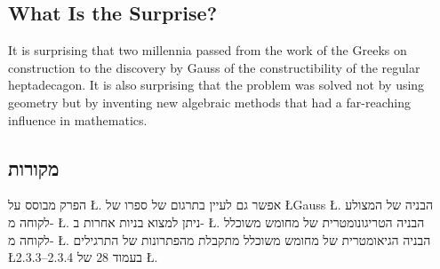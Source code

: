 \subsection*{What Is the Surprise?}

It is surprising that two millennia passed from the work of the Greeks on construction to the discovery by Gauss of the constructibility of the regular heptadecagon. It is also surprising that the problem was solved not by using geometry but by inventing new algebraic methods that had a far-reaching influence in mathematics.

\subsection*{מקורות}

הפרק מבוסס על
\L{\cite{jorg}}.
אפשר גם לעיין בתרגום של ספרו של 
\L{Gauss}
\L{\cite{gauss}}.
הבניה של המצולע לקוחה מ-%
\L{\cite{callagy}}.
ניתן למצוא בניות אחרות ב-%
\L{\cite{wiki:heptadecagon}}.
הבניה הטריגונומטרית של מחומש משוכלל לקוחה מ-%
\L{\cite{wiki:pentagon}}.
הבניה הגיאומטרית של מחומש משוכלל מתקבלת מהפתרונות של התרגילים
\L{2.3.3--2.3.4}
בעמוד
$28$
של
\L{\cite{stillwell}}.
